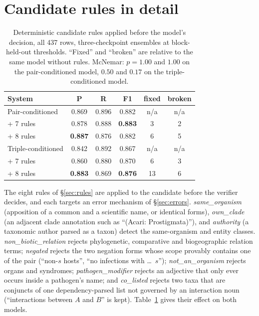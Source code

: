\documentclass[11pt]{article}
\begin{document}
\section{Candidate rules in detail}
\label{app:rules}

\begin{table}[t]\centering\small
\setlength{\tabcolsep}{3.6pt}
\begin{tabular}{lccccc}
\toprule
System & P & R & F1 & fixed & broken \\
\midrule
Pair-conditioned          & 0.869 & 0.896 & 0.882 & n/a & n/a \\
\quad + 7 rules           & 0.878 & 0.888 & \textbf{0.883} & 3 & 2 \\
\quad + 8 rules           & \textbf{0.887} & 0.876 & 0.882 & 6 & 5 \\
\midrule
Triple-conditioned        & 0.842 & 0.892 & 0.867 & n/a & n/a \\
\quad + 7 rules           & 0.860 & 0.880 & 0.870 & 6 & 3 \\
\quad + 8 rules           & \textbf{0.883} & 0.869 & \textbf{0.876} & 13 & 6 \\
\bottomrule
\end{tabular}
\caption{Deterministic candidate rules applied before the model's decision, all 437 rows,
three-checkpoint ensembles at block-held-out thresholds. ``Fixed'' and ``broken'' are relative to
the same model without rules. McNemar: $p = 1.00$ and $1.00$ on the pair-conditioned model, $0.50$
and $0.17$ on the triple-conditioned model.}
\label{tab:rules}
\end{table}

The eight rules of \S\ref{sec:rules} are applied to the candidate before the verifier decides,
and each targets an error mechanism of \S\ref{sec:errors}. \emph{same\_organism}
(apposition of a common and a scientific name, or identical forms), \emph{own\_clade} (an adjacent
clade annotation such as ``(Acari: Prostigmata)''), and \emph{authority} (a taxonomic author parsed
as a taxon) detect the same-organism and entity classes. \emph{non\_biotic\_relation} rejects
phylogenetic, comparative and biogeographic relation terms; \emph{negated} rejects the two
negation forms whose scope provably contains one of the pair (``non-$s$ hosts'', ``no infections
with \ldots\ $s$''); \emph{not\_an\_organism} rejects organs and syndromes; \emph{pathogen\_modifier}
rejects an adjective that only ever occurs inside a pathogen's name; and \emph{co\_listed} rejects
two taxa that are conjuncts of one dependency-parsed list not governed by an interaction noun
(``interactions between $A$ and $B$'' is kept). Table~\ref{tab:rules} gives their effect on both
models.
\end{document}
